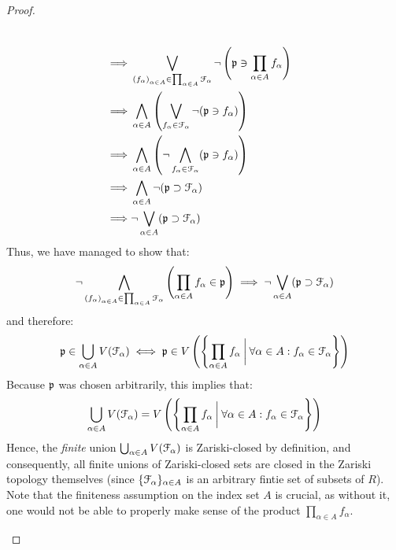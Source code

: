 \begin{proof}
\begin{enumerate}
$$\begin{aligned}
                                        \\
                                        \implies & \bigvee_{\left(f_{\alpha}\right)_{\alpha \in A} \in \prod_{\alpha \in A} \mathcal{F}_{\alpha}} \neg \left(\mathfrak{p} \ni \prod_{\alpha \in A} f_{\alpha}\right)
                                        \\
                                        \implies & \bigwedge_{\alpha \in A} \left(\bigvee_{f_{\alpha} \in \mathcal{F}_{\alpha}} \neg(\mathfrak{p} \ni f_{\alpha})\right)
                                        \\
                                        \implies & \bigwedge_{\alpha \in A} \left(\neg \bigwedge_{f_{\alpha} \in \mathcal{F}_{\alpha}} (\mathfrak{p} \ni f_{\alpha})\right)
                                        \\
                                        \implies & \bigwedge_{\alpha \in A} \neg (\mathfrak{p} \supset \mathcal{F}_{\alpha})
                                        \\
                                        \implies & \neg \bigvee_{\alpha \in A} (\mathfrak{p} \supset \mathcal{F}_{\alpha})
                                    \end{aligned}
                                $$
                            Thus, we have managed to show that:
                                $$\neg \bigwedge_{\left(f_{\alpha}\right)_{\alpha \in A} \in \prod_{\alpha \in A} \mathcal{F}_{\alpha}} \left(\prod_{\alpha \in A} f_{\alpha} \in \mathfrak{p}\right) \implies  \neg \bigvee_{\alpha \in A} (\mathfrak{p} \supset \mathcal{F}_{\alpha})$$
                            and therefore:
                                $$\mathfrak{p} \in \bigcup_{\alpha \in A} V(\mathcal{F}_{\alpha}) \iff \mathfrak{p} \in V\left(\left\{\prod_{\alpha \in A} f_{\alpha} \: \bigg| \: \forall \alpha \in A: f_{\alpha} \in \mathcal{F}_{\alpha} \right\}\right)$$
                            Because $\mathfrak{p}$ was chosen arbitrarily, this implies that:
                                $$\bigcup_{\alpha \in A} V(\mathcal{F}_{\alpha}) = V\left(\left\{\prod_{\alpha \in A} f_{\alpha} \: \bigg| \: \forall \alpha \in A: f_{\alpha} \in \mathcal{F}_{\alpha} \right\}\right)$$
                            Hence, the \textit{finite} union $\bigcup_{\alpha \in A} V(\mathcal{F}_{\alpha})$ is Zariski-closed by definition, and consequently, all finite unions of Zariski-closed sets are closed in the Zariski topology themselves (since $\{\mathcal{F}_{\alpha}\}_{\alpha \in A}$ is an arbitrary fintie set of subsets of $R$). Note that the finiteness assumption on the index set $A$ is crucial, as without it, one would not be able to properly make sense of the product $\prod_{\alpha \in A} f_{\alpha}$.

\end{enumerate}
\end{proof}
